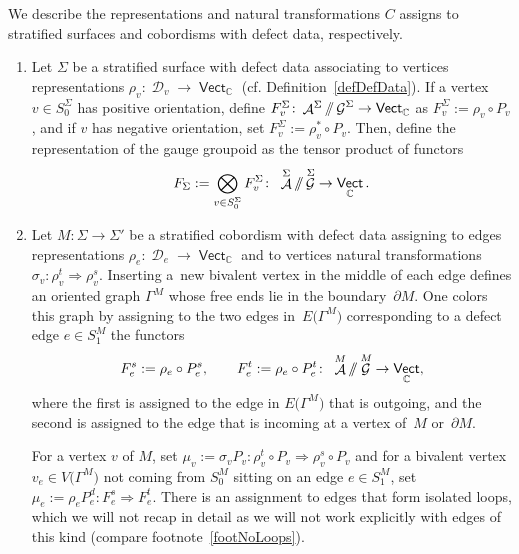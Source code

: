 \documentclass[pdftex]{sigma}
\DeclareMathOperator{\vect}{\mathsf{Vect}}
\DeclareMathOperator{\C}{\mathbb{C}}
\DeclareMathOperator{\cala}{\mathcal{A}}
\DeclareMathOperator{\cald}{\mathcal{D}}
\DeclareMathOperator{\calg}{\mathcal{G}}
\newcommand{\sslash}{\mathbin{/\mkern-6mu/}}
\numberwithin{equation}{section}
\theoremstyle{definition}
\begin{document}
We describe the representations and natural transformations $C$ assigns to stratified surfaces and cobordisms with defect data, respectively.
\begin{enumerate}\itemsep=0pt
 \item Let $\Sigma$ be a stratified surface with defect data associating to vertices representations $\rho_v\colon \cald_v \rightarrow \vect_{\C}$ (cf. Definition~\ref{defDefData}). If a vertex $v \in S_0^{\Sigma}$ has positive orientation, define $F_v^{\Sigma}\colon \cala^{\Sigma} \sslash \calg^{\Sigma} \rightarrow \vect_{\C}$ as $F_v^{\Sigma} := \rho_v \circ P_v$, and if $v$ has negative orientation, set $F_v^{\Sigma} := \rho_v^* \circ P_v$. Then, define the representation of the gauge groupoid as the tensor product of functors
 \begin{align}
 \label{eqGGRep}
 F_{\Sigma}:= \bigotimes_{v \in S_0^{\Sigma}} F_v^{\Sigma}\colon \ \cala^{\Sigma} \sslash \calg^{\Sigma} \rightarrow \vect_{\C}.
 \end{align}
 \item Let $M\colon \Sigma \rightarrow \Sigma'$ be a stratified cobordism with defect data assigning to edges representations $\rho_e\colon \cald_e \rightarrow \vect_{\C}$ and to vertices natural transformations $\sigma_v\colon \rho_v^t \Rightarrow \rho_v^s$. Inserting a~new bivalent vertex in the middle of each edge defines an oriented graph $\Gamma^M$ whose free ends lie in the boundary~$\partial M$. One colors this graph by assigning to the two edges in~$E\bigl(\Gamma^M\bigr)$ corresponding to a defect edge $e \in S_1^M$ the functors
 \begin{align*}
 F_e^s := \rho_e \circ P_e^s, \qquad F_e^t := \rho_e \circ P_e^t\colon \ \cala^M \sslash \calg^M \rightarrow \vect_{\C},
 \end{align*}
 where the first is assigned to the edge in $E\bigl(\Gamma^M\bigr)$ that is outgoing, and the second is assigned to the edge that is incoming at a vertex of~$M$ or~$\partial M$.

 For a vertex $v$ of $M$, set $\mu_v := \sigma_v P_v\colon \rho_v^t \circ P_v \Rightarrow \rho_v^s \circ P_v$ and for a bivalent vertex $v_e \in V\bigl(\Gamma^M\bigr)$ not coming from $S_0^M$ sitting on an edge $e \in S_1^M$, set $\mu_e:= \rho_eP_e^d\colon F_e^s \Rightarrow F_e^t$. There is an assignment to edges that form isolated loops, which we will not recap in detail as we will not work explicitly with edges of this kind (compare footnote~\ref{footNoLoops}).


\end{enumerate}
\end{document}
